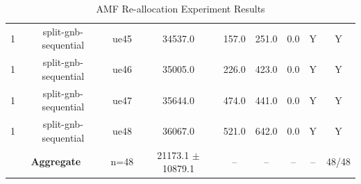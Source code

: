 \begin{table}[ht]
\begin{tabular}{|c|c|c|c|c|c|c|c|c|}
1 & split-gnb-sequential & ue45 & 34537.0 & 157.0 & 251.0 & 0.0 & Y & Y \\
1 & split-gnb-sequential & ue46 & 35005.0 & 226.0 & 423.0 & 0.0 & Y & Y \\
1 & split-gnb-sequential & ue47 & 35644.0 & 474.0 & 441.0 & 0.0 & Y & Y \\
1 & split-gnb-sequential & ue48 & 36067.0 & 521.0 & 642.0 & 0.0 & Y & Y \\
\multicolumn{2}{|c|}{\textbf{Aggregate}} & n=48 & 21173.1 $\pm$ 10879.1 & -- & -- & -- & -- & 48/48 \\
\hline
\end{tabular}
\caption{AMF Re-allocation Experiment Results}
\label{tab:amf_realloc}
\end{table}
